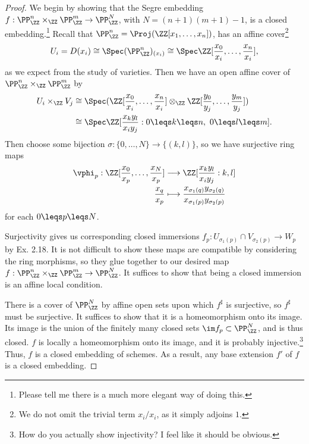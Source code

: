 \documentclass[12pt]{amsart}
\begin{document}
\begin{proof}
  We begin by showing that the Segre embedding $f: \PP_\ZZ^n\times_\ZZ\PP_\ZZ^m\to \PP_\ZZ^{N}$, with $N=(n+1)(m+1)-1$, is a closed embedding.\footnote{Please tell me there is a much more elegant way of doing this.}
  Recall that $\PP_\ZZ^n=\Proj (\ZZ[x_1,\ldots, x_n])$, has an affine cover\footnote{We do not omit the trivial term $x_i/x_i$, as it simply adjoins $1$.}
  \[
    U_i=D(x_i)\cong \Spec (\PP_\ZZ^n)_{(x_i)}\cong \Spec \ZZ[\frac{x_0}{x_i},\ldots, \frac{x_n}{x_i}],
  \]
  as we expect from the study of varieties.
  Then we have an open affine cover of $\PP_\ZZ^n\times_\ZZ\PP_\ZZ^m$ by
  \begin{align*}
    U_i\times_\ZZ V_j 
    &\cong \Spec (\ZZ[\frac{x_0}{x_i},\ldots, \frac{x_n}{x_i}]
    \otimes_\ZZ \ZZ[\frac{y_0}{y_j},\ldots, \frac{y_m}{y_j}]) \\
    &\cong \Spec \ZZ[\frac{x_ky_l}{x_iy_j}: 0\leqs k\leqs n, ~ 0\leqs l\leqs m].
  \end{align*}
  Then choose some bijection $\sigma:\{0,\ldots, N\}\to \{(k,l)\}$, so we have surjective ring maps 
  \begin{align*}
    \vphi_p: \ZZ[\frac{x_0}{x_p},\ldots, \frac{x_N}{x_p}] &\longrightarrow
    \ZZ[\frac{x_ky_l}{x_iy_j}: k,l] \\
    \frac{x_q}{x_p}&\longmapsto \frac{x_{\sigma_1(q)}y_{\sigma_2(q)}}{x_{\sigma_1(p)}y_{\sigma_2(p)}}
  \end{align*}
  for each $0\leqs p\leqs N$.

  Surjectivity gives us corresponding closed immersions $f_{p}:U_{\sigma_1(p)}\cap V_{\sigma_2(p)}\to W_p$ by Ex. 2.18.
  It is not difficult to show these maps are compatible by considering the ring morphisms, so they glue together to our desired map $f: \PP_\ZZ^n \times_\ZZ \PP_\ZZ^m \to \PP_\ZZ^N$.
  It suffices to show that being a closed immersion is an affine local condition.

  There is a cover of $\PP_\ZZ^N$ by affine open sets upon which $f^\sharp$ is surjective, so $f^\sharp$ must be surjective.
  It suffices to show that it is a homeomorphism onto its image.
  Its image is the union of the finitely many closed sets $\im f_p\subset \PP_\ZZ^N$, and is thus closed.
  $f$ is locally a homeomorphism onto its image, and it is probably injective.\footnote{How do you actually show injectivity? I feel like it should be obvious.} %
  Thus, $f$ is a closed embedding of schemes.
  As a result, any base extension $f'$ of $f$ is a closed embedding.


\end{proof}
\end{document}
